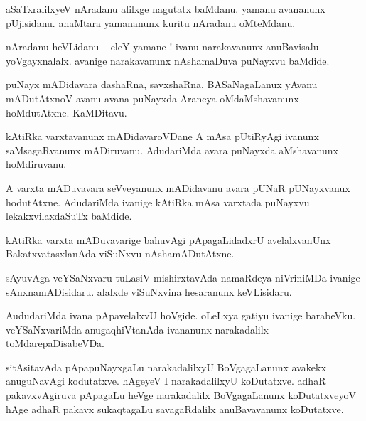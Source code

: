 \documentclass{article}
\begin{document}
\begin{mn}%
aSaTxralilxyeV nAradanu alilxge nagutatx baMdanu. yamanu avananunx pUjisidanu. anaMtara yamananunx 
kuritu nAradanu oMteMdanu.
\end{mn}

\begin{mn}%
nAradanu heVLidanu -- eleY yamane ! ivanu narakavanunx anuBavisalu yoVgayxnalalx. avanige 
narakavanunx nAshamaDuva puNayxvu baMdide.
\end{mn}

\begin{mn}%
puNayx mADidavara dashaRna, savxshaRna, BASaNagaLanux yAvanu mADutAtxnoV avanu avana puNayxda 
Araneya oMdaMshavanunx hoMdutAtxne. KaMDitavu.
\end{mn}

\begin{mn}%
kAtiRka varxtavanunx mADidavaroVDane A mAsa pUtiRyAgi ivanunx saMsagaRvanunx mADiruvanu. 
AdudariMda avara puNayxda aMshavanunx hoMdiruvanu.
\end{mn}

\begin{mn}%
A varxta mADuvavara seVveyanunx mADidavanu avara pUNaR pUNayxvanux hodutAtxne. AdudariMda ivanige 
kAtiRka mAsa varxtada puNayxvu lekakxvilaxdaSuTx baMdide.
\end{mn}

\begin{mn}%
kAtiRka varxta mADuvavarige bahuvAgi pApagaLidadxrU avelalxvanUnx BakatxvatasxlanAda viSuNxvu 
nAshamADutAtxne.
\end{mn}

\begin{mn}%
sAyuvAga veYSaNxvaru tuLasiV mishirxtavAda namaRdeya niVriniMDa ivanige sAnxnamADisidaru. alalxde 
viSuNxvina hesaranunx keVLisidaru.
\end{mn}

\begin{mn}%
AududariMda ivana pApavelalxvU hoVgide. oLeLxya gatiyu ivanige barabeVku. veYSaNxvariMda 
anugaqhiVtanAda ivananunx narakadalilx toMdarepaDisabeVDa.
\end{mn}

\begin{mn}%
sitAsitavAda pApapuNayxgaLu narakadalilxyU BoVgagaLanunx avakekx anuguNavAgi kodutatxve. hAgeyeV I 
narakadalilxyU koDutatxve. adhaR pakavxvAgiruva pApagaLu heVge narakadalilx BoVgagaLanunx 
koDutatxveyoV hAge adhaR pakavx sukaqtagaLu savagaRdalilx anuBavavanunx koDutatxve.
\end{mn}
\end{document}
